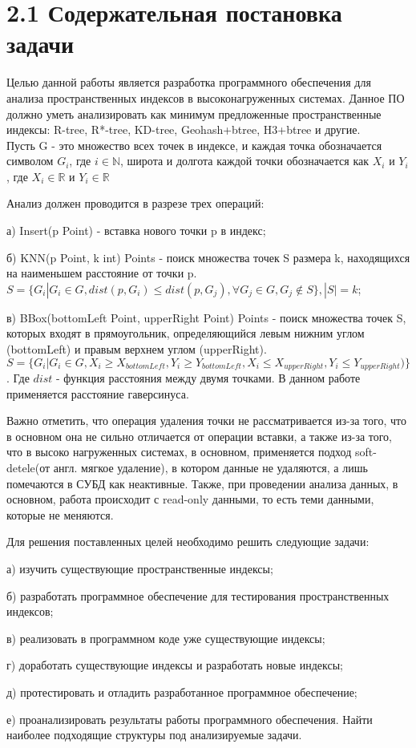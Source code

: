 \vspace{-2em}
\section{2.1 Содержательная постановка задачи}

Целью данной работы является разработка программного обеспечения для анализа пространственных индексов в высоконагруженных системах. Данное ПО должно уметь анализировать как минимум предложенные пространственные индексы: R-tree, R*-tree, KD-tree, Geohash+btree, H3+btree и другие.\\
Пусть G - это множество всех точек в индексе, и каждая точка обозначается символом $G_i$, где $i \in \mathbb{N}$, широта и долгота каждой точки обозначается как $X_i$ и $Y_i$, где $X_i \in \mathbb{R}$ и $Y_i \in \mathbb{R}$

Анализ должен проводится в разрезе трех операций:
\par а) Insert(p Point) - вставка нового точки p в индекс;
\par б) KNN(p Point, k int) Points -  поиск множества точек S размера k, находящихся на наименьшем расстояние от точки p. $S=\{G_i | G_i \in G, dist(p, G_i) \leq dist(p, G_j),  \forall G_j \in G, G_j \notin S \}, |S| = k$;
\par в) BBox(bottomLeft Point, upperRight Point) Points - поиск множества точек S, которых входят в прямоугольник, определяющийся левым нижним углом (bottomLeft) и правым верхнем углом (upperRight). $S=\{G_i | G_i \in G, X_i \geq X_{bottomLeft}, Y_i \geq Y_{bottomLeft}, X_i \leq X_{upperRight}, Y_i \leq Y_{upperRight} )\}$.
Где $dist$ - функция расстояния между двумя точками. В данном работе применяется расстояние гаверсинуса. 

Важно отметить, что операция удаления точки не рассматривается из-за того, что в основном она не сильно отличается от операции вставки\cite{bayerIndices}, а также из-за того, что в высоко нагруженных системах, в основном, применяется подход soft-detele(от англ. мягкое удаление), в котором данные не удаляются, а лишь помечаются в СУБД как неактивные. Также, при проведении анализа данных, в основном, работа происходит с read-only данными, то есть теми данными, которые не меняются. 

Для решения поставленных целей необходимо решить следующие задачи:
\par а) изучить существующие пространственные индексы;
\par б) разработать программное обеспечение для тестирования пространственных индексов;
\par в) реализовать в программном коде уже существующие индексы;
\par г) доработать существующие индексы и разработать новые индексы;
\par д) протестировать и отладить разработанное программное обеспечение;
\par е) проанализировать результаты работы программного обеспечения. Найти наиболее подходящие структуры под анализируемые задачи.

